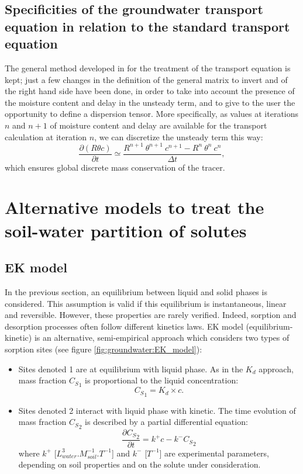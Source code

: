\subsection{Specificities of the groundwater transport equation in relation to the standard transport equation}
The general method developed in \CS for the treatment of the transport equation is kept; just a few changes in the definition
of the general matrix to invert and of the right hand side have been done, in order to take into account the presence of the
moisture content and delay in the unsteady term,
and to give to the user the opportunity to define a dispersion tensor.
More specifically, as values at iterations $n$ and $n+1$ of moisture content and delay are available for the transport calculation at iteration $n$,
we can discretize the unsteady term this way:
\begin{equation}
\label{eq:groundwater:unsteady}
\frac{\partial(R \theta c)}{\partial{t}} \simeq \frac{R^{n+1} \ \theta^{n+1} \ c^{n+1} - R^{n} \ \theta^{n} \ c^{n}}{\Delta t},
\end{equation}
which ensures global discrete mass conservation of the tracer.

\section{Alternative models to treat the soil-water partition of solutes}

\subsection{EK model}

In the previous section, an equilibrium between liquid and solid phases is
considered. This assumption is valid if this equilibrium is instantaneous,
linear and reversible.
However, these properties are rarely verified. Indeed, sorption and desorption
processes often follow different kinetics laws.
EK model (equilibrium-kinetic) is an alternative, semi-empirical approach
which considers two types of sorption sites
(see figure \ref{fig:groundwater:EK_model}):
\begin{itemize}
\item Sites denoted 1 are at equilibrium with liquid phase. As in the $K_d$
  approach, mass fraction ${C_S}_1$ is proportional to the liquid
  concentration:
  \begin{equation}
    \label{eq:groundwater:sites_equilibrium}
    {C_S}_1 = K_d \times c.
  \end{equation}
\item Sites denoted 2 interact with liquid phase with kinetic. The time
  evolution of mass fraction ${C_S}_2$ is described by a partial differential
  equation:
  \begin{equation}
    \label{eq:groundwater:sites_kinetic}
    \frac{\partial{{C_S}_2}}{\partial{t}} = k^+ c - k^- {C_S}_2
  \end{equation}
  where $k^+$ [$L^3_{water}.M^{-1}_{soil}.T^{-1}$] and $k^-$ [$T^{-1}$] are
  experimental parameters, depending on soil properties and on the solute
  under consideration.
\end{itemize}

